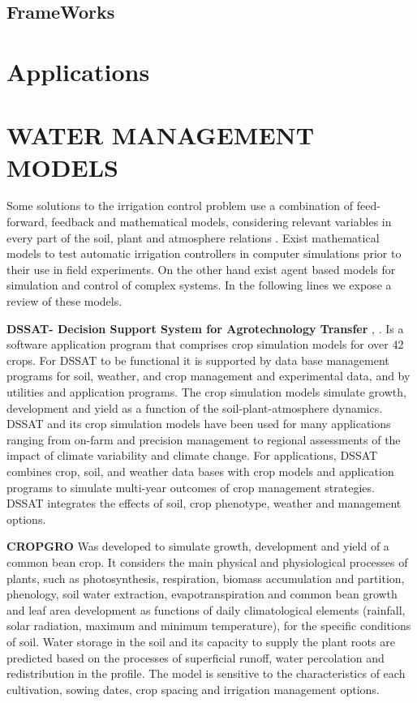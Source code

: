 \documentclass[letterpaper, 10 pt, conference]{ieeeconf}  %
\begin{document}
\subsection{FrameWorks}
\section{Applications}
\section{WATER MANAGEMENT MODELS}

Some solutions to the irrigation control problem use a combination of feed-forward, feedback and mathematical models, considering relevant variables in every part of the soil, plant and atmosphere relations \cite{Romero2012}. Exist mathematical models to test automatic irrigation controllers in computer simulations prior to their use in field experiments. On the other hand exist agent based models for simulation and control of complex systems. In the following lines we expose a review of these models.

\textbf{DSSAT- Decision Support System for Agrotechnology Transfer} \cite{hoogenboom2004decision}, \cite{Huang2016}. Is a software application program that comprises crop simulation models for over 42 crops. For DSSAT to be functional it is supported by data base management programs for soil, weather, and crop management and experimental data, and by utilities and application programs. The crop simulation models simulate growth, development and yield as a function of the soil-plant-atmosphere dynamics. DSSAT and its crop simulation models have been used for many applications ranging from on-farm and precision management to regional assessments of the impact of climate variability and climate change. For applications, DSSAT combines crop, soil, and weather data bases with crop models and application programs to simulate multi-year outcomes of crop management strategies. DSSAT integrates the effects of soil, crop phenotype, weather and management options.

\textbf{CROPGRO} \cite{boote1998simulation} Was developed to simulate growth, development and yield of a common bean crop. It considers the main physical and physiological processes of plants, such as photosynthesis, respiration, biomass accumulation and partition, phenology, soil water extraction, evapotranspiration and common bean
growth and leaf area development as functions of daily climatological elements (rainfall, solar radiation, maximum and minimum temperature), for the specific conditions of soil. Water storage in the soil and its capacity to supply the plant roots are predicted based on the processes of superficial runoff, water percolation and redistribution in the profile. The model is sensitive to the characteristics of each cultivation, sowing dates, crop spacing and irrigation management options.
\end{document}
